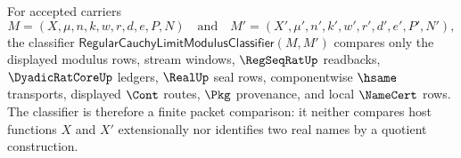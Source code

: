 \begin{definition}
\label{def:regular-cauchy-limit-modulus-classifier}
For accepted carriers
$$
M=(X,\mu,n,k,w,r,d,e,P,N)
\quad\text{and}\quad
M'=(X',\mu',n',k',w',r',d',e',P',N'),
$$
the classifier $\mathsf{RegularCauchyLimitModulusClassifier}(M,M')$ compares only the displayed modulus rows, stream windows, $\RegSeqRatUp$ readbacks, $\DyadicRatCoreUp$ ledgers, $\RealUp$ seal rows, componentwise $\hsame$ transports, displayed $\Cont$ routes, $\Pkg$ provenance, and local $\NameCert$ rows. The classifier is therefore a finite packet comparison: it neither compares host functions $X$ and $X'$ extensionally nor identifies two real names by a quotient construction.
\end{definition}

